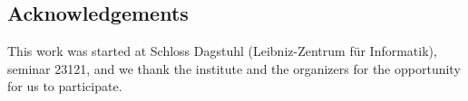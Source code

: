 \documentclass[a4paper]{article}
\begin{document}

\subsection*{Acknowledgements}
This work was started at Schloss Dagstuhl (Leibniz-Zentrum für
Informatik), seminar 23121, and we thank the institute and the
organizers for the opportunity for us to participate.



\end{document}
